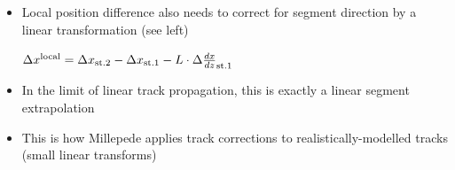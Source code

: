 \documentclass[compress]{beamer}
\begin{document}
\begin{frame}
\begin{columns}
\begin{itemize}
\item Local position difference also needs to correct for segment direction by a linear transformation (see left)

\mbox{\hspace{-0.75 cm}$\Delta x^{\mbox{\scriptsize local}} = \Delta x_{\mbox{\scriptsize st.2}} - \Delta x_{\mbox{\scriptsize st.1}} - L \cdot \Delta \frac{dx}{dz}_{\mbox{\scriptsize st.1}}$}

\item In the limit of linear track propagation, this is exactly a linear segment extrapolation

\item This is how Millepede applies track corrections to realistically-modelled tracks (small linear transforms)

\end{itemize}
\end{columns}
\end{frame}
\end{document}
